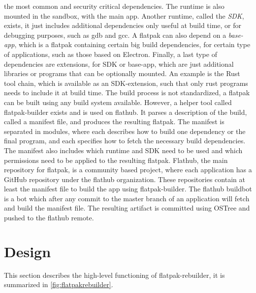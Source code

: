 \documentclass[a4paper,11pt,oneside]{report}
\theoremstyle{definition}
\newcommand{\sysname}{flatpak-rebuilder\xspace}
\newcommand{\fp}{flatpak\xspace}
\newcommand{\fh}{flathub\xspace}
\newcommand{\fb}{flatpak-builder\xspace}
\newcommand{\fhbb}{flathub buildbot\xspace}
\newcommand{\ot}{OSTree\xspace}
\begin{document}
the most common and security critical dependencies. The runtime is also mounted
in the sandbox, with the main app. Another runtime, called the \emph{SDK},
exists, it just includes additional dependencies only useful at build time, or
for debugging purposes, such as gdb and gcc. A \fp can also depend on a
\emph{base-app}, which is a \fp containing certain big build dependencies, for
certain type of applications, such as those based on Electron. Finally, a last
type of dependencies are extensions, for SDK or base-app, which are just
additional libraries or programs that can be optionally mounted. An example is
the Rust tool chain, which is available as an SDK-extension, such that only
rust programs needs to include it at build time. The build process is not
standardized, a \fp can be built using any build system available. However, a
helper tool called \fb exists and is used on \fh. It parses a description of
the build, called a manifest file, and produces the resulting \fp. The manifest
is separated in modules, where each describes how to build one dependency or
the final program, and each specifies how to fetch the necessary build
dependencies. The manifest also includes which runtime and SDK need to be used
and which permissions need to be applied to the resulting \fp. Flathub, the
main repository for \fp, is a community based project, where each application
has a GitHub repository under the \fh organization. These repositories contain
at least the manifest file to build the app using \fb. The \fhbb is a bot which
after any commit to the master branch of an application will fetch and build
the manifest file. The resulting artifact is committed using \ot and pushed to
the \fh remote.


\chapter{Design}
\label{chap:design}

This section describes the high-level functioning of \sysname, it is summarized
in \autoref{fig:flatpakrebuilder}.
\end{document}

